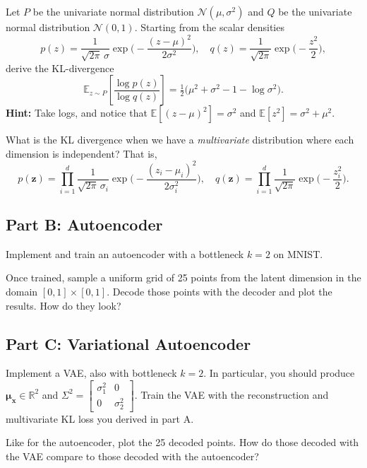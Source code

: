 \documentclass{article}
\begin{document}
Let $P$ be the univariate normal distribution $\mathcal{N}(\mu,\sigma^2)$ and $Q$ be the univariate normal distribution $\mathcal{N}(0,1)$.
Starting from the scalar densities
$$
  p(z)=\frac{1}{\sqrt{2\pi}\,\sigma}\exp\!\Big(-\frac{(z-\mu)^2}{2\sigma^2}\Big),\quad
  q(z)=\frac{1}{\sqrt{2\pi}}\exp\!\Big(-\frac{z^2}{2}\Big),
$$
derive the KL-divergence
$$
  \mathbb{E}_{z\sim P}\left[\frac{\log p(z)}{\log q(z)}\right]
  =\tfrac12\big(\mu^2+\sigma^2-1-\log\sigma^2\big).
$$
\textbf{Hint:} Take logs, and notice that $\mathbb{E}[(z-\mu)^2]=\sigma^2$ and $\mathbb{E}[z^2]=\sigma^2+\mu^2$. 

What is the KL divergence when we have a \textit{multivariate} distribution where each dimension is independent? That is,
$$
  p(\mathbf{z})=\prod_{i=1}^d \frac{1}{\sqrt{2\pi}\,\sigma_i}\exp\!\Big(-\frac{(z_i-\mu_i)^2}{2\sigma_i^2}\Big),\quad
  q(\mathbf{z})=\prod_{i=1}^d \frac{1}{\sqrt{2\pi}}\exp\!\Big(-\frac{z_i^2}{2}\Big).
$$

\subsection*{Part B: Autoencoder}

Implement and train an autoencoder with a bottleneck $k=2$ on MNIST.

Once trained, sample a uniform grid of 25 points from the latent dimension in the domain $[0,1] \times [0,1]$.
Decode those points with the decoder and plot the results.
How do they look?


\subsection*{Part C: Variational Autoencoder}

Implement a VAE, also with bottleneck $k=2$. In particular, you should produce $\mathbf{\mu_x} \in \mathbb{R}^2$ and $\Sigma^2 = \begin{bmatrix}\sigma_1^2 & 0 \\ 0 & \sigma_2^2\end{bmatrix}$.
Train the VAE with the reconstruction and multivariate KL loss you derived in part A.

Like for the autoencoder, plot the 25 decoded points.
How do those decoded with the VAE compare to those decoded with the autoencoder?

%
\end{document}
